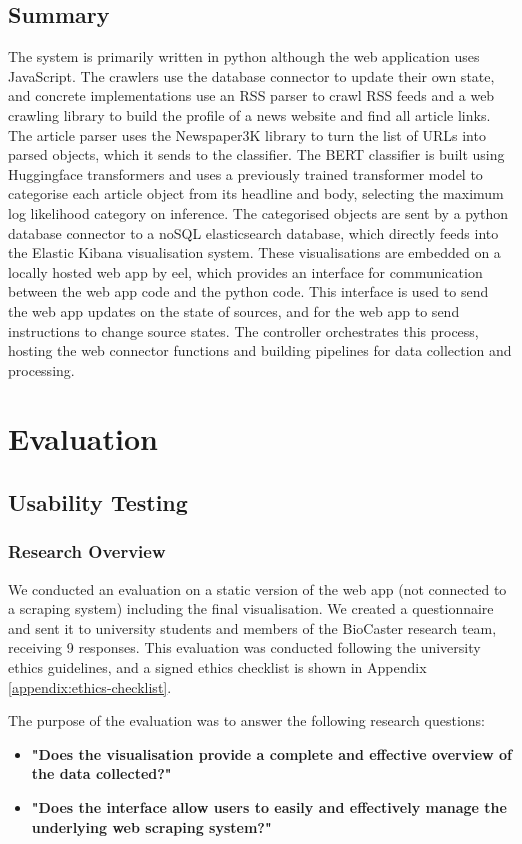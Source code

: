\documentclass{l4proj}
\begin{document}
\section{Summary}
The system is primarily written in python although the web application uses JavaScript. The crawlers use the database connector to update their own state, and concrete implementations use an RSS parser to crawl RSS feeds and a web crawling library to build the profile of a news website and find all article links. The article parser uses the Newspaper3K library to turn the list of URLs into parsed objects, which it sends to the classifier. The BERT classifier is built using Huggingface transformers and uses a previously trained transformer model to categorise each article object from its headline and body, selecting the maximum log likelihood category on inference. The categorised objects are sent by a python database connector to a noSQL elasticsearch database, which directly feeds into the Elastic Kibana visualisation system. These visualisations are embedded on a locally hosted web app by eel, which provides an interface for communication between the web app code and the python code. This interface is used to send the web app updates on the state of sources, and for the web app to send instructions to change source states. The controller orchestrates this process, hosting the web connector functions and building pipelines for data collection and processing.

\chapter{Evaluation}

\section{Usability Testing}
\subsection{Research Overview}
We conducted an evaluation on a static version of the web app (not connected to a scraping system) including the final visualisation. We created a questionnaire and sent it to university students and members of the BioCaster research team, receiving 9 responses. This evaluation was conducted following the university ethics guidelines, and a signed ethics checklist is shown in Appendix \ref{appendix:ethics-checklist}. \par
The purpose of the evaluation was to answer the following research questions:
\begin{itemize}
    \item \textbf{"Does the visualisation provide a complete and effective overview of the data collected?"}
    \item \textbf{"Does the interface allow users to easily and effectively manage the underlying web scraping system?"}
\end{itemize}
\end{document}
